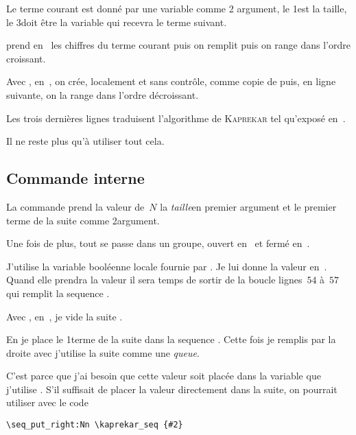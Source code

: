 
Le terme courant est donné par une \gls{variable} comme 2\ieme
argument, le 1\ier est la taille, le 3\ieme doit être la
\gls{variable} qui recevra le terme suivant.

 prend en~ les chiffres du terme courant
puis on remplit puis on range dans l'ordre croissant.

Avec , en~, on crée, localement et sans
contrôle,  comme copie de  puis,
en ligne suivante, on la range dans l'ordre décroissant.

Les trois dernières lignes traduisent l'algorithme de \textsc{Kaprekar}
tel qu'exposé en~\pageref{algokap}.

Il ne reste plus qu'à utiliser tout cela.

\subsection{Commande interne}


La commande  prend la valeur
de~\(N\) \TO la \emph{taille}\TF en premier argument et le premier
terme de la suite comme 2\ieme argument.

Une fois de plus, tout se passe dans un groupe, ouvert en~
et fermé en~.

J'utilise la \gls{variable} booléenne locale 
fournie par \Expliii{}. Je lui donne la valeur \VRAI{}
en~. Quand elle prendra la valeur \FAUX{} il sera temps de
sortir de la boucle \TO lignes~\(54\) à~\(57\)\TF qui remplit la
\gls{sequence} .

Avec , en~, je vide la suite
.

En  je place le 1\ier terme de la suite dans la
\gls{sequence} . Cette fois je remplis par la
droite avec  \TO j'utilise la suite comme une
\emph{queue}\TF.

C'est parce que j'ai besoin que cette valeur soit placée dans la
\gls{variable}  que j'utilise
. S'il suffisait de placer la valeur
directement dans la suite, on pourrait utiliser
 avec le code
\vspace{-\baselineskip}
\begin{Verbatim}[frame=lines,framesep=0.75\baselineskip]
\seq_put_right:Nn \kaprekar_seq {#2}
\end{Verbatim}

